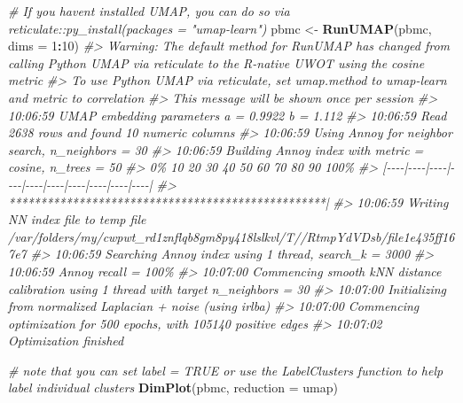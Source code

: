 \documentclass[
]{book}
\newenvironment{Shaded}{\begin{snugshade}}{\end{snugshade}}
\newcommand{\AttributeTok}[1]{\textcolor[rgb]{0.13,0.29,0.53}{#1}}
\newcommand{\CommentTok}[1]{\textcolor[rgb]{0.56,0.35,0.01}{\textit{#1}}}
\newcommand{\DecValTok}[1]{\textcolor[rgb]{0.00,0.00,0.81}{#1}}
\newcommand{\FunctionTok}[1]{\textcolor[rgb]{0.13,0.29,0.53}{\textbf{#1}}}
\newcommand{\NormalTok}[1]{#1}
\newcommand{\OtherTok}[1]{\textcolor[rgb]{0.56,0.35,0.01}{#1}}
\newcommand{\SpecialCharTok}[1]{\textcolor[rgb]{0.81,0.36,0.00}{\textbf{#1}}}
\newcommand{\StringTok}[1]{\textcolor[rgb]{0.31,0.60,0.02}{#1}}
\begin{document}
\begin{Shaded}
\begin{Highlighting}[]
\CommentTok{\# If you haven\textquotesingle{}t installed UMAP, you can do so via reticulate::py\_install(packages = "umap{-}learn")}
\NormalTok{pbmc }\OtherTok{\textless{}{-}} \FunctionTok{RunUMAP}\NormalTok{(pbmc, }\AttributeTok{dims =} \DecValTok{1}\SpecialCharTok{:}\DecValTok{10}\NormalTok{)}
\CommentTok{\#\textgreater{} Warning: The default method for RunUMAP has changed from calling Python UMAP via reticulate to the R{-}native UWOT using the cosine metric}
\CommentTok{\#\textgreater{} To use Python UMAP via reticulate, set umap.method to \textquotesingle{}umap{-}learn\textquotesingle{} and metric to \textquotesingle{}correlation\textquotesingle{}}
\CommentTok{\#\textgreater{} This message will be shown once per session}
\CommentTok{\#\textgreater{} 10:06:59 UMAP embedding parameters a = 0.9922 b = 1.112}
\CommentTok{\#\textgreater{} 10:06:59 Read 2638 rows and found 10 numeric columns}
\CommentTok{\#\textgreater{} 10:06:59 Using Annoy for neighbor search, n\_neighbors = 30}
\CommentTok{\#\textgreater{} 10:06:59 Building Annoy index with metric = cosine, n\_trees = 50}
\CommentTok{\#\textgreater{} 0\%   10   20   30   40   50   60   70   80   90   100\%}
\CommentTok{\#\textgreater{} [{-}{-}{-}{-}|{-}{-}{-}{-}|{-}{-}{-}{-}|{-}{-}{-}{-}|{-}{-}{-}{-}|{-}{-}{-}{-}|{-}{-}{-}{-}|{-}{-}{-}{-}|{-}{-}{-}{-}|{-}{-}{-}{-}|}
\CommentTok{\#\textgreater{} **************************************************|}
\CommentTok{\#\textgreater{} 10:06:59 Writing NN index file to temp file /var/folders/my/cwpwt\_rd1znflqb8gm8py418lslkvl/T//RtmpYdVDsb/file1e435ff167e7}
\CommentTok{\#\textgreater{} 10:06:59 Searching Annoy index using 1 thread, search\_k = 3000}
\CommentTok{\#\textgreater{} 10:06:59 Annoy recall = 100\%}
\CommentTok{\#\textgreater{} 10:07:00 Commencing smooth kNN distance calibration using 1 thread with target n\_neighbors = 30}
\CommentTok{\#\textgreater{} 10:07:00 Initializing from normalized Laplacian + noise (using irlba)}
\CommentTok{\#\textgreater{} 10:07:00 Commencing optimization for 500 epochs, with 105140 positive edges}
\CommentTok{\#\textgreater{} 10:07:02 Optimization finished}
\end{Highlighting}
\end{Shaded}

\begin{Shaded}
\begin{Highlighting}[]
\CommentTok{\# note that you can set \textasciigrave{}label = TRUE\textasciigrave{} or use the LabelClusters function to help label individual clusters}
\FunctionTok{DimPlot}\NormalTok{(pbmc, }\AttributeTok{reduction =} \StringTok{\textquotesingle{}umap\textquotesingle{}}\NormalTok{)}
\end{Highlighting}
\end{Shaded}
\end{document}
